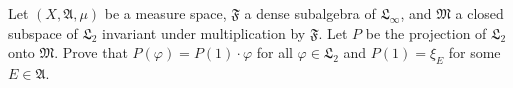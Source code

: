 Let $(X, \mathfrak{A}, \mu)$ be a measure space, $\mathfrak{F}$ a dense subalgebra of $\mathfrak{L}_\infty$, and $\mathfrak{M}$ a closed subspace of $\mathfrak{L}_2$ invariant under multiplication by $\mathfrak{F}$. Let $P$ be the projection of $\mathfrak{L}_2$ onto $\mathfrak{M}$. Prove that $P(\varphi) = P(1) \cdot \varphi$ for all $\varphi \in \mathfrak{L}_2$ and $P(1) = \xi_E$ for some $E \in \mathfrak{A}$.
